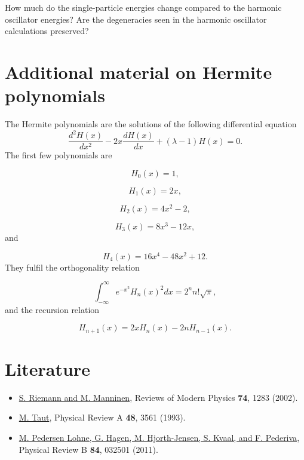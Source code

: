 \documentclass[%
oneside,                 %
final,                   %
10pt]{article}
\begin{document}
How much do the single-particle energies change compared to the harmonic oscillator energies? Are the degeneracies seen in the harmonic oscillator calculations preserved?

\section*{Additional material on Hermite polynomials}

The Hermite polynomials are the solutions of the following differential
equation
\begin{equation}
   \frac{d^2H(x)}{dx^2}-2x\frac{dH(x)}{dx}+
       (\lambda-1)H(x)=0.
   \label{eq:hermite}
\end{equation}
The first few polynomials are

\begin{equation*}
   H_0(x)=1,
\end{equation*}

\begin{equation*}
    H_1(x)=2x,
\end{equation*}

\begin{equation*}
    H_2(x)=4x^2-2,
\end{equation*}

\begin{equation*}
    H_3(x)=8x^3-12x,
\end{equation*}
and

\begin{equation*}
    H_4(x)=16x^4-48x^2+12.
\end{equation*}
They fulfil the orthogonality relation

\begin{equation*}
  \int_{-\infty}^{\infty}e^{-x^2}H_n(x)^2dx=2^nn!\sqrt{\pi},
\end{equation*}
and the recursion relation

\begin{equation*}
  H_{n+1}(x)=2xH_{n}(x)-2nH_{n-1}(x).
\end{equation*}




\section*{Literature}
\begin{itemize}
  \item \href{{https://journals.aps.org/rmp/issues/74/4}}{S. Riemann and M. Manninen}, Reviews of Modern Physics \textbf{74}, 1283 (2002). 

  \item \href{{http://journals.aps.org/pra/abstract/10.1103/PhysRevA.48.3561}}{M. Taut}, Physical Review A \textbf{48}, 3561 (1993).

  \item \href{{https://journals.aps.org/prb/abstract/10.1103/PhysRevB.84.115302}}{M. Pedersen Lohne, G. Hagen, M. Hjorth-Jensen, S. Kvaal, and F. Pederiva}, Physical Review B \textbf{84}, 032501 (2011).
\end{itemize}
\end{document}
